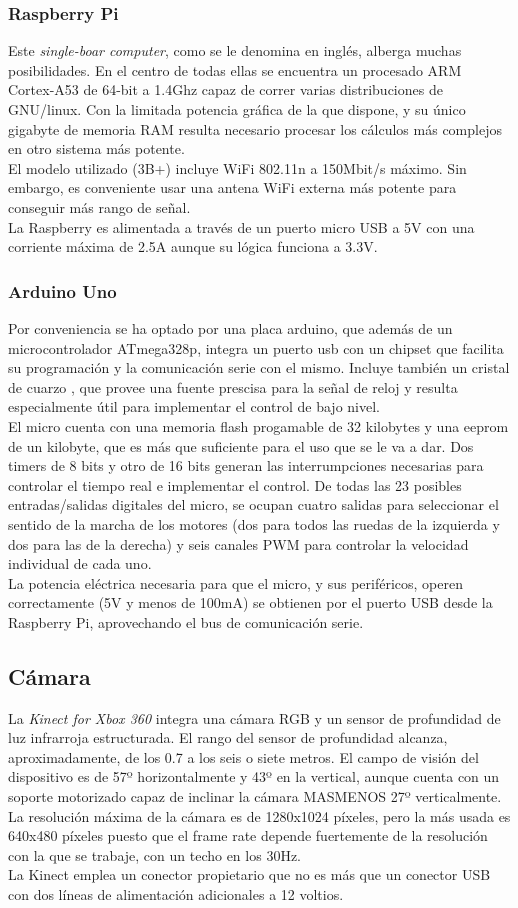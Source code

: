 \subsubsection{Raspberry Pi}
Este \textit{single-boar computer}, como se le denomina en inglés, alberga muchas posibilidades. En el centro de todas ellas se encuentra un procesado ARM Cortex-A53 de 64-bit a 1.4Ghz capaz de correr varias distribuciones de GNU/linux. Con la limitada potencia gráfica de la que dispone, y su único gigabyte de memoria RAM resulta necesario procesar los cálculos más complejos en otro sistema más potente.\\
El modelo utilizado (3B+) incluye WiFi 802.11n a 150Mbit/s máximo. Sin embargo, es conveniente usar una antena WiFi externa más potente para conseguir más rango de señal.\\
La Raspberry es alimentada a través de un puerto micro USB a 5V con una corriente máxima de 2.5A aunque su lógica funciona a 3.3V.
\subsubsection{Arduino Uno}
Por conveniencia se ha optado por una placa arduino, que además de un microcontrolador ATmega328p, integra un puerto usb con un chipset que facilita su programación y la comunicación serie con el mismo. Incluye también un cristal de cuarzo , que provee una fuente prescisa para la señal de reloj y resulta especialmente útil para implementar el control de bajo nivel.\\
El micro cuenta con una memoria flash progamable de 32 kilobytes y una eeprom de un kilobyte, que es más que suficiente para el uso que se le va a dar. Dos timers de 8 bits y otro de 16 bits generan las interrumpciones necesarias para controlar el tiempo real e implementar el control. De todas las 23 posibles entradas/salidas digitales del micro, se ocupan cuatro salidas para seleccionar el sentido de la marcha de los motores (dos para todos las ruedas de la izquierda y dos para las de la derecha) y seis canales PWM para controlar la velocidad individual de cada uno.\\
La potencia eléctrica necesaria para que el micro, y sus periféricos, operen correctamente (5V y menos de 100mA) se obtienen por el puerto USB desde la Raspberry Pi, aprovechando el bus de comunicación serie.

\subsection{Cámara}
La \textit{Kinect for Xbox 360} integra una cámara RGB y un sensor de profundidad de luz infrarroja estructurada. El rango del sensor de profundidad alcanza, aproximadamente, de los 0.7 a los seis o siete metros. El campo de visión del dispositivo es de 57º horizontalmente y 43º en la vertical, aunque cuenta con un soporte motorizado capaz de inclinar la cámara MASMENOS 27º verticalmente. La resolución máxima de la cámara es de 1280x1024 píxeles, pero la más usada es 640x480 píxeles puesto que el frame rate depende fuertemente de la resolución con la que se trabaje, con un techo en los 30Hz.\\
La Kinect emplea un conector propietario que no es más que un conector USB con dos líneas de alimentación adicionales a 12 voltios.